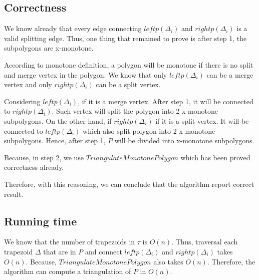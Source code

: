 \documentclass[12pt]{article}
\begin{document}
\subsection*{Correctness}
We know already that every edge connecting $leftp(\Delta_i)$ and $rightp(\Delta_i)$
is a valid splitting edge. Thus, one thing that remained to prove is
after step 1, the subpolygons are x-monotone.


According to monotone definition, a polygon will be monotone if there is no
split and merge vertex in the polygon. We know that only $leftp(\Delta_i)$ can be
a merge vertex and only $rightp(\Delta_i)$ can be a split vertex.

Considering $leftp(\Delta_i)$, if it is a merge vertex. After step 1, it will be
connected to $rightp(\Delta_i)$. Such vertex will split the polygon into 2 x-monotone
subpolygons. On the other hand, if $rightp(\Delta_i)$ if it is a split vertex.
It will be connected to $leftp(\Delta_{i})$ which also split polygon into 2 x-monotone
subpolygons. Hence, after step 1, $P$ will be divided into x-monotone subpolygons.

Because, in step 2, we use $TriangulateMonotonePolygon$ which has been proved correctness already.

Therefore, with this reasoning, we can conclude that the algorithm report correct result.

\subsection*{Running time}
We know that the number of trapezoids in $\tau$ is $O(n)$. Thus, traversal each trapezoid $\Delta$ that
are in $P$ and connect $leftp(\Delta_i)$ and $rightp(\Delta_i)$ takes $O(n)$. Because,
$TriangulateMonotonePolygon$ also takes $O(n)$. Therefore, the algorithm can compute
a triangulation of $P$ in $O(n)$.
\end{document}
